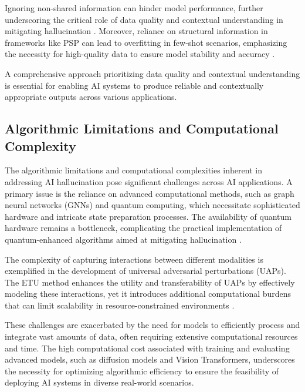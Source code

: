 Ignoring non-shared information can hinder model performance, further underscoring the critical role of data quality and contextual understanding in mitigating hallucination \cite{wang2022rethinkingminimalsufficientrepresentation}. Moreover, reliance on structural information in frameworks like PSP can lead to overfitting in few-shot scenarios, emphasizing the necessity for high-quality data to ensure model stability and accuracy \cite{ge2024psppretrainingstructureprompt}.

A comprehensive approach prioritizing data quality and contextual understanding is essential for enabling AI systems to produce reliable and contextually appropriate outputs across various applications.

\subsection{Algorithmic Limitations and Computational Complexity} \label{subsec:Algorithmic Limitations and Computational Complexity}

The algorithmic limitations and computational complexities inherent in addressing AI hallucination pose significant challenges across AI applications. A primary issue is the reliance on advanced computational methods, such as graph neural networks (GNNs) and quantum computing, which necessitate sophisticated hardware and intricate state preparation processes. The availability of quantum hardware remains a bottleneck, complicating the practical implementation of quantum-enhanced algorithms aimed at mitigating hallucination \cite{liao2024graphneuralnetworksquantum}.

The complexity of capturing interactions between different modalities is exemplified in the development of universal adversarial perturbations (UAPs). The ETU method enhances the utility and transferability of UAPs by effectively modeling these interactions, yet it introduces additional computational burdens that can limit scalability in resource-constrained environments \cite{zhang2024universaladversarialperturbationsvisionlanguage}.

These challenges are exacerbated by the need for models to efficiently process and integrate vast amounts of data, often requiring extensive computational resources and time. The high computational cost associated with training and evaluating advanced models, such as diffusion models and Vision Transformers, underscores the necessity for optimizing algorithmic efficiency to ensure the feasibility of deploying AI systems in diverse real-world scenarios.

